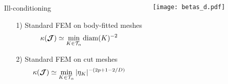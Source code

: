 \begin{frame}
\begin{overprint}


  \begin{columns}[onlytextwidth]



    \begin{block}{Ill-conditioning}

      \begin{itemize}
        \item[1)] Standard FEM on body-fitted meshes
          \begin{equation*}
            \kappa(\boldsymbol{\mathcal{J}}) \simeq  \min_{K \in \mathcal{T}_\alpha} {\rm diam}(K)^{-2}
          \end{equation*}
        \item[2)] Standard FEM on cut meshes
          \begin{equation*}
            \kappa(\boldsymbol{\mathcal{J}}) \simeq  \min_{K \in \mathcal{T}_\alpha} |\eta_K|^{-(2p+1-2/D)}
          \end{equation*}
      \end{itemize}




    \end{block}


    \centering
    \texttt{[image: betas\_d.pdf]}

  \end{columns}

\end{overprint}


\end{frame}


